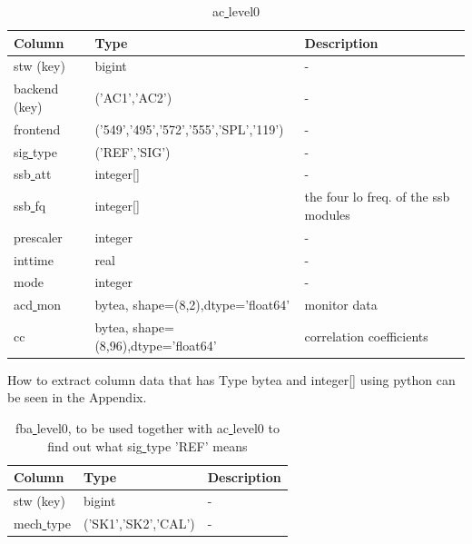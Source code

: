 \documentclass[12pt]{article}
\begin{document}
\begin{table}[ht]
\caption{ac\underline{ }level0}
\centering
\begin{tabular}{l l l}
\hline\hline
Column & Type & Description \\ [0.5ex]
\hline
stw (key)            & bigint                                &  - \\
backend (key)        & ('AC1','AC2')                         & -\\
frontend             & ('549','495','572','555','SPL','119') & -\\
sig\underline{ }type & ('REF','SIG')                         & -\\
ssb\underline{ }att  & integer[]                             & -\\
ssb\underline{ }fq   & integer[]                             & the four lo freq. of the ssb modules\\
prescaler            & integer                               & -\\
inttime              & real                                  & -\\
mode                 & integer                               & -\\
acd\underline{ }mon  & bytea, shape=(8,2),dtype='float64'    & monitor data\\
cc                   & bytea, shape=(8,96),dtype='float64'   & correlation coefficients\\[1ex]
\hline
\end{tabular}
\label{table:ac0}
\end{table}
How to extract column data that has Type bytea and integer[] using
python can be seen in the Appendix.
\begin{table}[ht]
\caption{fba\underline{ }level0, to be used together with ac\underline{ }level0
to find out what sig\underline{ }type 'REF' means}
\centering
\begin{tabular}{l l l}
\hline\hline
Column & Type & Description \\ [0.5ex]
\hline
stw (key) & bigint & - \\
mech\underline{ }type & ('SK1','SK2','CAL') & -\\[1ex]
\hline
\end{tabular}
\label{table:fba0}
\end{table}
\end{document}
